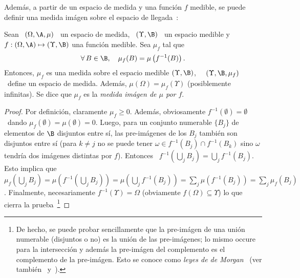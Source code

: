 Adem\'as, a partir de un espacio de medida y una funci\'on $f$ medible, se puede
definir  una  medida  im\'agen   sobre  el  espacio  de  llegada~\cite{AshDol99,
  AthLah06, Bog07:v1, Coh13}:
%
\begin{teorema}
\label{Teo:MP:MedidaImagen}
%
  Sean  \ $(\Omega,\A,\mu)$  \  un espacio  de  medida, \  $(\Upsilon,\B)$ \  un
  espacio  medible  y  $f:  (\Omega,\A)  \mapsto  (\Upsilon,\B)$  una  funci\'on
  medible. Sea $\mu_f$ tal que
  \[
  \forall \,  B \in  \B, \quad  \mu_f(B) = \mu\left( f^{-1}(B) \right).
  \]
  Entonces, $\mu_f$  es una medida  sobre el espacio medible  $(\Upsilon,\B)$, \
  \ie  \  $(\Upsilon,\B,\mu_f)$  \  define  un  espacio  de  medida.   Adem\'as,
  $\mu(\Omega) = \mu_f(\Upsilon)$ (posiblemente  infinitas). Se dice que $\mu_f$
  es la {\it medida im\'agen de $\mu$ por $f$}.
\end{teorema}
%
\begin{proof}
  Por   definici\'on,  claramente   $\mu_f  \ge   0$.    Adem\'as,  obviosamente
  $f^{-1}(\emptyset) =  \emptyset$ \ dando $\mu_f(\emptyset)  = \mu(\emptyset) =
  0$.   Luego, para  un conjunto  numerable  $\{ B_j  \}$ de  elementos de  $\B$
  disjuntos entre s\'i, las pre-im\'agenes  de los $B_j$ tambi\'en son disjuntos
  entre s\'i  (para $k  \ne j$ no  se puede  tener $\omega \in  f^{-1}(B_j) \cap
  f^{-1}(B_k)$  sino  $\omega$  tendr\'ia  dos im\'agenes  distintas  por  $f$).
  Entonces \ $f^{-1}\left( \bigcup_j B_j \right) = \bigcup_j f^{-1}(B_j)$.  Esto
  implica  que \  $\mu_f\left( \bigcup_j  B_j \right)  =  \mu\left( f^{-1}\left(
      \bigcup_j B_j \right) \right)  = \mu\left( \bigcup_j f^{-1}(B_j) \right) =
  \sum_j  \mu\left(  f^{-1}(B_j)  \right)  =  \sum_j  \mu_f(B_j)$.   Finalmente,
  necesariamente  $f^{-1}(\Upsilon) =  \Omega$ (obviamente  $f(\Omega) \subseteq
  \Upsilon$)  lo  que  cierra  la  prueba~\footnote{De hecho,  se  puede  probar
    sencillamente que la pre-im\'agen de  una uni\'on numerable (disjuntos o no)
    es la uni\'on de las  pre-im\'agenes; lo mismo occure para la intersecci\'on
    y  adem\'as  la  pre-im\'agen  del  complemento  es  el  complemento  de  la
    pre-im\'agen.  Esto se conoce  como {\it leyes de de Morgan}~\cite{AshDol99,
      AthLah06,   Coh13,    HogMck13}   (ver   tambi\'en~\cite[Cap.~1]{KolFom57}
    y~\cite[Caps.~5~\&~6]{KolFom61}).\label{Foot:MP:Jacobiana}}
\end{proof}

